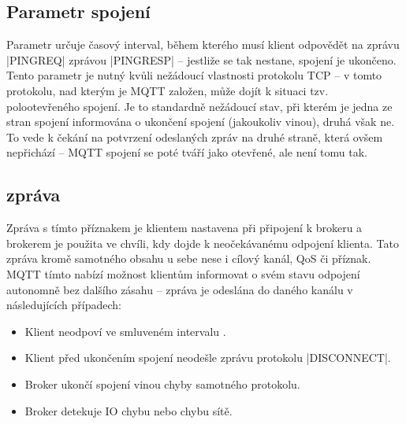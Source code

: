 \subsection{Parametr spojení }\label{subsec:parametr-spojeni-keep-alive}
Parametr  určuje časový interval, během kterého musí klient odpovědět na zprávu \ic|PINGREQ| zprávou
\ic|PINGRESP| -- jestliže se tak nestane, spojení je ukončeno.
Tento parametr je nutný kvůli nežádoucí vlastnosti protokolu TCP --
v tomto protokolu, nad kterým je MQTT založen, může dojít k situaci tzv. polootevřeného spojení.
Je to standardně nežádoucí stav, při kterém je jedna ze stran spojení informována o ukončení spojení (jakoukoliv
vinou), druhá však ne.
To vede k čekání na potvrzení odeslaných zpráv na druhé straně, která ovšem nepřichází -- MQTT spojení se poté
tváří jako otevřené, ale není tomu tak.

\subsection{ zpráva}\label{subsec:last-will-zprava}
Zpráva s tímto příznakem je klientem nastavena při připojení k brokeru a brokerem je použita ve chvíli, kdy dojde
k neočekávanému odpojení klienta.
Tato zpráva  kromě samotného obsahu u sebe nese i cílový kanál, QoS či 
příznak.
MQTT tímto nabízí možnost klientům informovat o svém stavu odpojení autonomně bez dalšího zásahu --
 zpráva je odeslána do daného kanálu v následujících případech:
\begin{itemize}
    \item Klient neodpoví ve smluveném intervalu .
    \item Klient před ukončením spojení neodešle zprávu protokolu \ic|DISCONNECT|.
    \item Broker ukončí spojení vinou chyby samotného protokolu.
    \item Broker detekuje IO chybu nebo chybu sítě.
\end{itemize}

